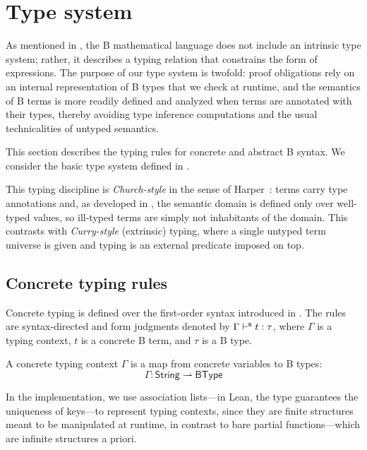 \section{Type system}
\label{sec:b-typing}

As mentioned in , the B mathematical language does not include an
intrinsic type system; rather, it describes a typing relation that constrains the form of expressions.
The purpose of our type system is twofold: proof obligations rely on an internal representation
of B types that we check at runtime, and the semantics of B terms is more readily defined and
analyzed when terms are annotated with their types, thereby avoiding type inference
computations and the usual technicalities of untyped semantics.

This section describes the typing rules for concrete and abstract B syntax.
We consider the basic type system defined in .

\begin{remark}
  This typing discipline is \emph{Church-style} in the sense of Harper~\cite{harper2016pfpl}: terms carry type annotations and, as developed in , the semantic domain is defined only over well-typed values, so ill-typed terms are simply not inhabitants of the domain.
  This contrasts with \emph{Curry-style} (extrinsic) typing, where a single untyped term universe is given and typing is an external predicate imposed on top.
\end{remark}


\subsection{Concrete typing rules}
\label{subsec:b-concrete-typing}

Concrete typing is defined over the first-order syntax introduced in .
The rules are syntax-directed and form judgments denoted by \(\Gamma \vdash^{\scriptscriptstyle{\mathsf{B}}} t : \tau\),
where \(\Gamma\) is a typing context, \(t\) is a concrete B term, and \(\tau\) is a B type.

\begin{definition}
A concrete typing context \(\Gamma\) is a map from concrete variables to B types:
\[
  \Gamma : \mathsf{String} \rightharpoonup \mathsf{BType}
\]
\end{definition}

\begin{remark}
  In the implementation, we use association lists---in Lean, the type  guarantees the uniqueness of keys---to represent typing contexts, since they are finite structures meant to be manipulated at runtime, in contrast to bare partial functions---which are infinite structures a priori. 
\end{remark}

